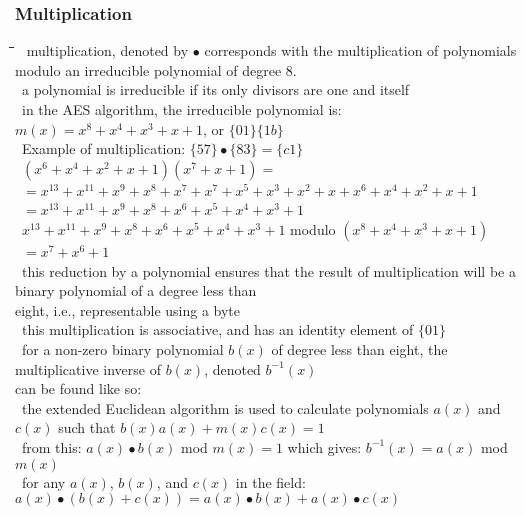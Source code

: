 \documentclass[10pt,letterpaper]{scrartcl}
\newcommand{\tbul}{\textbullet}
\newcommand{\tend}{\>\textendash}
\newcommand{\tabDef}{\hspace{2em}\=\hspace{2em}\=\hspace{2em}\=\hspace{2em}\=\kill}
\begin{document}
\subsubsection*{Multiplication}\begin{tabbing}\tabDef
\tbul\ multiplication, denoted by $\bullet$ corresponds with the multiplication of polynomials modulo an irreducible polynomial of degree 8. \\
\tend\ a polynomial is irreducible if its only divisors are one and itself \\
\tbul\ in the AES algorithm, the irreducible polynomial is: $m(x)=x^8+x^4+x^3+x+1$, or $\{01\}\{1b\}$ \\
\tbul\ Example of multiplication: $\{57\}\bullet \{83\} = \{c1\}$ \\
\>\ $(x^6 + x^4 + x^2 + x + 1)(x^7 + x + 1) = $ \\
\>\>\>\>\ $=x^{13} + x^{11} + x^9 + x^8 + x^7 + x^7 + x^5 + x^3 + x^2 + x + x^6 + x^4 + x^2 + x + 1$ \\
\>\>\>\>\ $=x^{13} + x^{11} + x^9 + x^8 + x^6 + x^5 + x^4 + x^3 + 1$ \\
\>\>\>\>\ $x^{13} + x^{11} + x^9 + x^8 + x^6 + x^5 + x^4 + x^3 + 1$ modulo $(x^8 + x^4 + x^3 + x + 1)$ \\
\>\>\>\>\ $=x^7 + x^6 + 1$ \\
\tbul\ this reduction by a polynomial ensures that the result of multiplication will be a binary polynomial of a degree less than\\ eight, i.e., representable using a byte \\
\tbul\ this multiplication is associative, and has an identity element of $\{01\}$ \\
\tbul\ for a non-zero binary polynomial $b(x)$ of degree less than eight, the multiplicative inverse of $b(x)$, denoted $b^{-1}(x)$\\ can be found like so: \\
\tend\ the extended Euclidean algorithm is used to calculate polynomials $a(x)$ and $c(x)$ such that $b(x)a(x)+m(x)c(x)=1$\\
\tend\ from this: $a(x)\bullet b(x)$ mod $m(x)=1$ which gives: $b^{-1}(x)=a(x)$ mod $m(x)$ \\
\tend\ for any $a(x)$, $b(x)$, and $c(x)$ in the field: $a(x)\bullet (b(x)+c(x))=a(x)\bullet b(x)+a(x)\bullet c(x)$\end{tabbing}
\end{document}
